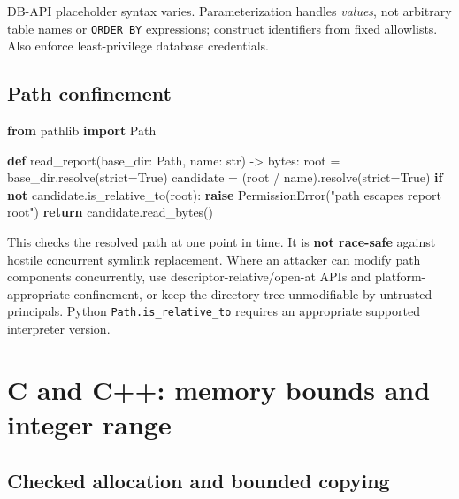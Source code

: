 \documentclass[
  letterpaper,
]{article}
\newenvironment{Shaded}{}{}
\newcommand{\BuiltInTok}[1]{\textcolor[rgb]{0.00,0.50,0.00}{#1}}
\newcommand{\ControlFlowTok}[1]{\textcolor[rgb]{0.00,0.44,0.13}{\textbf{#1}}}
\newcommand{\ImportTok}[1]{\textcolor[rgb]{0.00,0.50,0.00}{\textbf{#1}}}
\newcommand{\KeywordTok}[1]{\textcolor[rgb]{0.00,0.44,0.13}{\textbf{#1}}}
\newcommand{\NormalTok}[1]{#1}
\newcommand{\OperatorTok}[1]{\textcolor[rgb]{0.40,0.40,0.40}{#1}}
\newcommand{\PreprocessorTok}[1]{\textcolor[rgb]{0.74,0.48,0.00}{#1}}
\newcommand{\StringTok}[1]{\textcolor[rgb]{0.25,0.44,0.63}{#1}}
\newcommand{\VariableTok}[1]{\textcolor[rgb]{0.10,0.09,0.49}{#1}}
\begin{document}
DB-API placeholder syntax varies. Parameterization handles
\emph{values}, not arbitrary table names or \texttt{ORDER\ BY}
expressions; construct identifiers from fixed allowlists. Also enforce
least-privilege database credentials.

\subsection{Path confinement}\label{path-confinement}

\begin{Shaded}
\begin{Highlighting}[]
\ImportTok{from}\NormalTok{ pathlib }\ImportTok{import}\NormalTok{ Path}

\KeywordTok{def}\NormalTok{ read\_report(base\_dir: Path, name: }\BuiltInTok{str}\NormalTok{) }\OperatorTok{{-}\textgreater{}} \BuiltInTok{bytes}\NormalTok{:}
\NormalTok{    root }\OperatorTok{=}\NormalTok{ base\_dir.resolve(strict}\OperatorTok{=}\VariableTok{True}\NormalTok{)}
\NormalTok{    candidate }\OperatorTok{=}\NormalTok{ (root }\OperatorTok{/}\NormalTok{ name).resolve(strict}\OperatorTok{=}\VariableTok{True}\NormalTok{)}
    \ControlFlowTok{if} \KeywordTok{not}\NormalTok{ candidate.is\_relative\_to(root):}
        \ControlFlowTok{raise} \PreprocessorTok{PermissionError}\NormalTok{(}\StringTok{"path escapes report root"}\NormalTok{)}
    \ControlFlowTok{return}\NormalTok{ candidate.read\_bytes()}
\end{Highlighting}
\end{Shaded}

This checks the resolved path at one point in time. It is \textbf{not
race-safe} against hostile concurrent symlink replacement. Where an
attacker can modify path components concurrently, use
descriptor-relative/open-at APIs and platform-appropriate confinement,
or keep the directory tree unmodifiable by untrusted principals. Python
\texttt{Path.is\_relative\_to} requires an appropriate supported
interpreter version.

\section{C and C++: memory bounds and integer
range}\label{c-and-c-memory-bounds-and-integer-range}

\subsection{Checked allocation and bounded
copying}\label{checked-allocation-and-bounded-copying}
\end{document}
